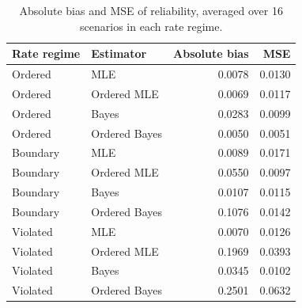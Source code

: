 \begin{table}[htbp]
\centering
\caption{Absolute bias and MSE of reliability, averaged over 16 scenarios in each rate regime.}\label{tab:points}
\small
\begin{tabular}{llrr}
\toprule
Rate regime & Estimator & Absolute bias & MSE \\
\midrule
Ordered & MLE & 0.0078 & 0.0130 \\
Ordered & Ordered MLE & 0.0069 & 0.0117 \\
Ordered & Bayes & 0.0283 & 0.0099 \\
Ordered & Ordered Bayes & 0.0050 & 0.0051 \\
Boundary & MLE & 0.0089 & 0.0171 \\
Boundary & Ordered MLE & 0.0550 & 0.0097 \\
Boundary & Bayes & 0.0107 & 0.0115 \\
Boundary & Ordered Bayes & 0.1076 & 0.0142 \\
Violated & MLE & 0.0070 & 0.0126 \\
Violated & Ordered MLE & 0.1969 & 0.0393 \\
Violated & Bayes & 0.0345 & 0.0102 \\
Violated & Ordered Bayes & 0.2501 & 0.0632 \\
\bottomrule
\end{tabular}
\end{table}
